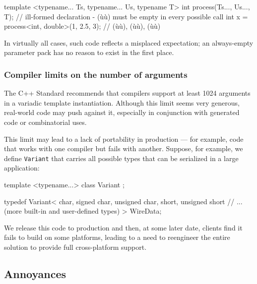 \begin{emcppslisting}[emcppsbatch=e40]
template <typename... Ts, typename... Us, typename T>
int process(Ts..., Us..., T);
    // ill-formed declaration - (ù{}ù) must be empty in every possible call
int x = process<int, double>(1, 2.5, 3);
    // (ù{}ù), (ù{}ù), (ù{}ù)
\end{emcppslisting}
    

\noindent In virtually all cases, such code reflects a misplaced expectation; an
always-empty parameter pack has no reason to exist in the first place.

\subsubsection[Compiler limits on the number of arguments]{Compiler limits on the number of arguments}\label{compiler-limits-on-the-number-of-arguments}

The C++ Standard recommends that compilers support at least 1024
arguments in a variadic template instantiation. Although this limit
seems very generous, real-world code may push against it, especially in
conjunction with generated code or combinatorial uses.

This limit may lead to a lack of portability in production --- for
example, code that works with one compiler but fails with another.
Suppose, for example, we define \lstinline!Variant! that carries all
possible types that can be serialized in a large application:


\begin{emcppshiddenlisting}[emcppsbatch=e41]
template <typename...>
class Variant { };
\end{emcppshiddenlisting}
\begin{emcppslisting}[emcppsbatch=e41]
typedef Variant<
    char,
    signed char,
    unsigned char,
    short,
    unsigned short
    // ... (more built-in and user-defined types)
>
WireData;
\end{emcppslisting}
    

\noindent We release this code to production and then, at some later date, clients
find it fails to build on some platforms, leading to a need to
reengineer the entire solution to provide full cross-platform support.

\subsection[Annoyances]{Annoyances}\label{annoyances-variadic}

